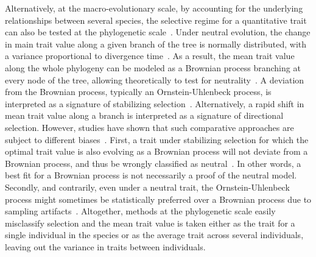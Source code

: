 \documentclass{article}
\begin{document}
Alternatively, at the macro-evolutionary scale, by accounting for the underlying relationships between several species, the selective regime for a quantitative trait can also be tested at the phylogenetic scale~\cite{felsenstein_phylogenies_1985}.
Under neutral evolution, the change in main trait value along a given branch of the tree is normally distributed, with a variance proportional to divergence time~\cite{hansen_translating_1996}.
As a result, the mean trait value along the whole phylogeny can be modeled as a Brownian process branching at every node of the tree, allowing theoretically to test for neutrality~\cite{hansen_translating_1996, harmon_phylogenetic_2018}.
A deviation from the Brownian process, typically an Ornstein-Uhlenbeck process, is interpreted as a signature of stabilizing selection~\cite{catalan_drift_2019}.
Alternatively, a rapid shift in mean trait value along a branch is interpreted as a signature of directional selection.
However, studies have shown that such comparative approaches are subject to different biases~\cite{harmon_phylogenetic_2018}.
First, a trait under stabilizing selection for which the optimal trait value is also evolving as a Brownian process will not deviate from a Brownian process, and thus be wrongly classified as neutral~\cite{hansen_translating_1996}.
In other words, a best fit for a Brownian process is not necessarily a proof of the neutral model.
Secondly, and contrarily, even under a neutral trait, the Ornstein-Uhlenbeck process might sometimes be statistically preferred over a Brownian process due to sampling artifacts~\cite{silvestro_measurement_2015, cooper_cautionary_2016, price_detecting_2022}.
Altogether, methods at the phylogenetic scale easily misclassify selection and the mean trait value is taken either as the trait for a single individual in the species or as the average trait across several individuals, leaving out the variance in traits between individuals.
\end{document}
